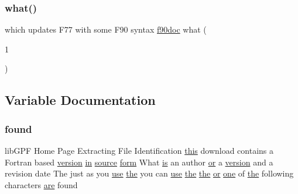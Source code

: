 \subsubsection{\texorpdfstring{what()}{what()}}
{\footnotesize\ttfamily which updates F77 with some F90 syntax \hyperlink{what__overview_81_8txt_aab2f56fdcdfab484c0d861985675a92f}{f90doc} what (\begin{DoxyParamCaption}\item[{1}]{ }\end{DoxyParamCaption})\hspace{0.3cm}{\ttfamily [new]}}



\subsection{Variable Documentation}
\mbox{\label{what__overview_81_8txt_ac0a3098bb3d5de70ed1c81da8bfd2599}} 
\subsubsection{\texorpdfstring{found}{found}}
{\footnotesize\ttfamily lib\+G\+PF Home Page Extracting File Identification \hyperlink{M__stopwatch_83_8txt_ad62a52042bb610eee5b36b5516caec22}{this} download contains a Fortran based \hyperlink{inquiry__stopwatch_83_8txt_aee378be19d20935dd436517beda00ee4}{version} \hyperlink{M__journal_83_8txt_afce72651d1eed785a2132bee863b2f38}{in} \hyperlink{ufpp__overview_81_8txt_a4d6669ece605d05985c83a04dd38e0ad}{source} \hyperlink{what__overview_81_8txt_ab6ccd3cf736f24d661599d9ce944e9bf}{form} What \hyperlink{intro__blas1_83_8txt_a42a91df93f840595de3019ceb5d1df23}{is} an author \hyperlink{what__overview_81_8txt_a93f5d39a36ed511cc0dc88a20a517388}{or} a \hyperlink{inquiry__stopwatch_83_8txt_aee378be19d20935dd436517beda00ee4}{version} and a revision date The just as you \hyperlink{intro__blas1_83_8txt_a04fa2694d85f67a675bb3f45f7241f48}{use} \hyperlink{M__stopwatch_83_8txt_a0f266597de2e57eb3aa964927bb30e14}{the} you can \hyperlink{intro__blas1_83_8txt_a04fa2694d85f67a675bb3f45f7241f48}{use} \hyperlink{M__stopwatch_83_8txt_a0f266597de2e57eb3aa964927bb30e14}{the} \hyperlink{M__stopwatch_83_8txt_a0f266597de2e57eb3aa964927bb30e14}{the} \hyperlink{what__overview_81_8txt_a93f5d39a36ed511cc0dc88a20a517388}{or} \hyperlink{M__stopwatch_83_8txt_aff7b067dcc41169a210cb1c0de45a496}{one} of \hyperlink{M__stopwatch_83_8txt_a0f266597de2e57eb3aa964927bb30e14}{the} following characters \hyperlink{M__stopwatch_83_8txt_a5040be02b832eba08820289c8a1f81c4}{are} found}

